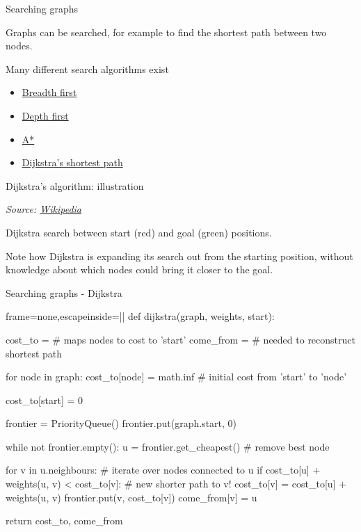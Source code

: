 \documentclass[compress,xcolor=table]{beamer}
\newcommand{\source}[2]{{\tiny\it Source: \href{#1}{#2}}}
\begin{document}
\begin{frame}{Searching graphs}

Graphs can be searched, for example to find the shortest path between
two nodes.

Many different search algorithms exist

\begin{itemize}
\item \href{http://en.wikipedia.org/wiki/Breadth-first_search}{Breadth
  first}
\item \href{http://en.wikipedia.org/wiki/Depth-first_search}{Depth first}
\item \href{http://en.wikipedia.org/wiki/A*_search_algorithm}{A*}
\item \href{http://en.wikipedia.org/wiki/Dijkstra's_algorithm}{Dijkstra's
  shortest path}
\end{itemize}

\end{frame}

\begin{frame}{Dijkstra's algorithm: illustration}

    \begin{center}

        \source{http://en.wikipedia.org/wiki/Dijkstra's_algorithm}{Wikipedia}
    \end{center}

    Dijkstra search between start (red) and goal (green)
    positions.

    Note how Dijkstra is expanding its search out from the
    starting position, without knowledge about which nodes could bring it
    closer to the goal.

\end{frame}

\begin{frame}[fragile]{Searching graphs - Dijkstra}

\begin{pythoncode*}{frame=none,escapeinside=||}
def dijkstra(graph, weights, start):

  cost_to = {} # maps nodes to cost to 'start'
  come_from = {} # needed to reconstruct shortest path

  for node in graph:
    cost_to[node] = math.inf # initial cost from 'start' to 'node'

  cost_to[start] = 0

  frontier = PriorityQueue()
  frontier.put(graph.start, 0)

  while not frontier.empty():
    u = frontier.get_cheapest() # remove best node

    for v in u.neighbours: # iterate over nodes connected to u
      if cost_to[u] + weights(u, v) < cost_to[v]: # new shorter path to v!
        cost_to[v] = cost_to[u] + weights(u, v)
        frontier.put(v, cost_to[v])
        come_from[v] = u

  return cost_to, come_from
\end{pythoncode*}
\end{frame}
\end{document}
